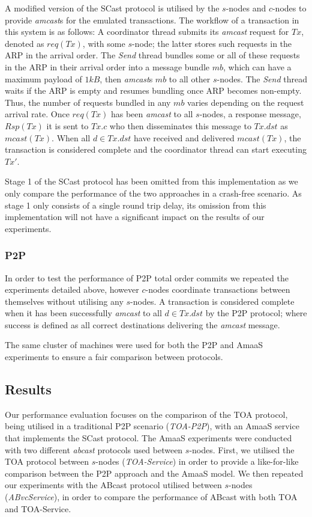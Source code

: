	A modified version of the \textsf{SCast} protocol is utilised by the $s$-nodes and $c$-nodes to provide \emph{amcast}s for the emulated transactions.  The workflow of a transaction in this system is as follows: A coordinator thread submits its \emph{amcast} request for $Tx$, denoted as $req(Tx)$, with some $s$-node; the latter stores such requests in the ARP in the arrival order. The \emph{Send} thread bundles some or all of these requests in the ARP in their arrival order into a message bundle $mb$, which can have a maximum payload of $1kB$, then \emph{amcast}s $mb$ to all other $s$-nodes.  The \emph{Send} thread waits if the ARP is empty and resumes bundling once ARP becomes non-empty. Thus, the number of requests bundled in any $mb$ varies depending on the request arrival rate. Once $req(Tx)$ has been \emph{amcast} to all $s$-nodes, a response message, $Rsp(Tx)$ it is sent to $Tx.c$ who then disseminates this message to $Tx.dst$ as $mcast(Tx)$.  When all $d \in Tx.dst$ have received and delivered $mcast(Tx)$, the transaction is considered complete and the coordinator thread can start executing $Tx'$.  
	
    Stage 1 of the \textsf{SCast} protocol has been omitted from this implementation as we only compare the performance of the two approaches in a crash-free scenario.  As stage 1 only consists of a single round trip delay, its omission from this implementation will not have a significant impact on the results of our experiments.  
	
	\subsubsection*{P2P}
	In order to test the performance of P2P total order commits we repeated the experiments detailed above, however $c$-nodes coordinate transactions between themselves without utilising any $s$-nodes.  A transaction is considered complete when it has been successfully \emph{amcast} to all $d \in Tx.dst$ by the P2P protocol; where success is defined as all correct destinations delivering the \emph{amcast} message. 
	
	The same cluster of machines were used for both the P2P and \textsf{AmaaS} experiments to ensure a fair comparison between protocols.   
	
	\subsection{Results}\label{sec:AmaaS_results}
	Our performance evaluation focuses on the comparison of the TOA protocol, being utilised in a traditional P2P scenario (\emph{TOA-P2P}), with an \textsf{AmaaS} service that implements the \textsf{SCast} protocol.  The \textsf{AmaaS} experiments were conducted with two different \emph{abcast} protocols used between $s$-nodes.  First, we utilised the TOA protocol between $s$-nodes (\emph{TOA-Service}) in order to provide a like-for-like comparison between the P2P approach and the \textsf{AmaaS} model. We then repeated our experiments with the \textsf{ABcast} protocol utilised between $s$-nodes (\emph{ABvcService}), in order to compare the performance of \textsf{ABcast} with both TOA and TOA-Service.  
    
